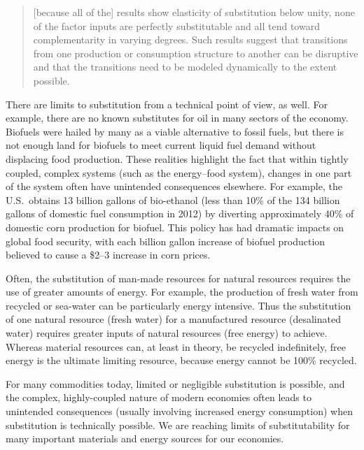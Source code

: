 \begin{quote}
	[because all of the] results show elasticity of substitution below unity, 
	none of the factor inputs are perfectly substitutable and 
	all tend toward complementarity in varying degrees. 
	Such results suggest that transitions 
	from one production or consumption structure to another 
	can be disruptive and that the transitions 
	need to be modeled dynamically to the extent possible.\cite[p.~8]{de-Wit:2013aa}
\end{quote}

There are limits to substitution from a technical point of view, as well.
For example, there are no known substitutes for oil 
in many sectors of the economy.\cite{Hirsch2005}
Biofuels were hailed by many as a viable alternative to fossil fuels, but
there is not enough land for biofuels to meet current liquid fuel demand
without displacing food production.
These realities highlight the fact that within tightly coupled, 
complex systems (such as the energy--food system),
changes in one part of the system often have unintended consequences elsewhere.
For example, 
the U.S.\ obtains 13 billion gallons of bio-ethanol 
(less than 10\% of the 134 billion gallons of domestic fuel consumption in 2012)
by diverting approximately 40\%
of domestic corn production for biofuel.\cite{EIA2014, USDA2014}
This policy has had dramatic impacts on global food security,
with each billion gallon increase of biofuel production believed to cause
a \$2--3 increase in corn prices.\cite{Kemick2013}

Often, the substitution of man-made resources for natural resources
requires the use of greater amounts of energy.
For example, the production of fresh water from recycled or sea-water
can be particularly energy intensive.
Thus the substitution of one natural resource (fresh water)
for a manufactured resource (desalinated water)
requires greater inputs of natural resources (free energy) to achieve.
Whereas material resources can, at least in theory,
be recycled indefinitely,
free energy is the ultimate limiting resource, 
because energy cannot be 100\% recycled.

For many commodities today, limited or negligible substitution is possible,
and the complex, highly-coupled nature of modern economies
often leads to unintended consequences (usually involving increased energy consumption)
when substitution is technically possible.
We are reaching limits of substitutability for many important 
materials and energy sources for our economies.


